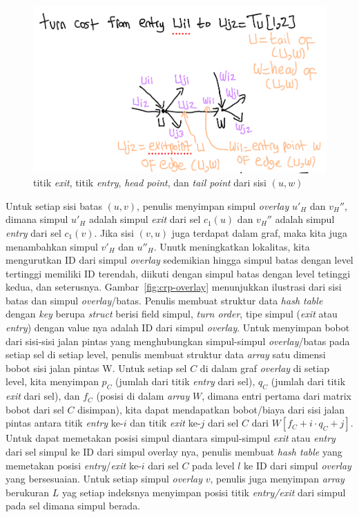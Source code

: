 \begin{figure}[H]
    \includegraphics[scale=0.4]{figures/turn_cost_exit_entry.png}
    \caption{titik \textit{exit}, titik \textit{entry}, \textit{head point}, dan \textit{tail point} dari sisi $(u,w)$}
    \label{fig:crp-exit-entry-point}
\end{figure}


Untuk setiap sisi batas $(u,v)$, penulis menyimpan simpul \textit{overlay} $u'_{H}$ dan $v_{H}''$, dimana simpul $u'_{H}$  adalah simpul \textit{exit} dari sel $c_1(u)$ dan $v_{H}''$ adalah simpul \textit{entry} dari sel $c_1(v)$. Jika sisi $(v,u)$ juga terdapat dalam graf, maka kita juga menambahkan simpul $v'_H$ dan $u''_{H}$. Unutk meningkatkan lokalitas, kita mengurutkan ID dari simpul \textit{overlay} sedemikian hingga simpul batas dengan level tertinggi memiliki ID terendah, diikuti dengan simpul batas dengan level tetinggi kedua, dan seterusnya. Gambar~\ref{fig:crp-overlay} menunjukkan ilustrasi dari sisi batas dan simpul \textit{overlay}/batas. Penulis membuat struktur data \textit{hash table} dengan \textit{key} berupa \textit{struct} berisi field simpul, \textit{turn order}, tipe simpul (\textit{exit} atau \textit{entry}) dengan value nya adalah ID dari simpul \textit{overlay}. Untuk menyimpan bobot dari sisi-sisi jalan pintas yang menghubungkan simpul-simpul \textit{overlay}/batas pada setiap sel di setiap level, penulis membuat struktur data \textit{array} satu dimensi bobot sisi jalan pintas W. Untuk setiap sel $C$  di dalam graf \textit{overlay} di setiap level, kita menyimpan $p_C$ (jumlah dari titik \textit{entry} dari sel), $q_C$ (jumlah dari titik \textit{exit} dari sel), dan $f_C$ (posisi di dalam \textit{array} $W$, dimana entri pertama dari matrix bobot dari sel $C$ disimpan), kita dapat mendapatkan bobot/biaya dari sisi jalan pintas antara titik \textit{entry} ke-$i$ dan titik \textit{exit} ke-$j$ dari sel $C$ dari $W[f_C+i\cdot q_C + j]$. Untuk dapat memetakan posisi simpul diantara simpul-simpul \textit{exit} atau \textit{entry} dari sel simpul ke ID dari simpul overlay nya, penulis membuat \textit{hash table} yang memetakan posisi \textit{entry}/\textit{exit} ke-$i$ dari sel $C$ pada level $l$ ke ID dari simpul \textit{overlay} yang bersesuaian. Untuk setiap simpul \textit{overlay} $v$, penulis juga menyimpan \textit{array} berukuran $L$ yag setiap indeksnya menyimpan posisi titik \textit{entry/exit} dari simpul pada sel dimana simpul berada.



